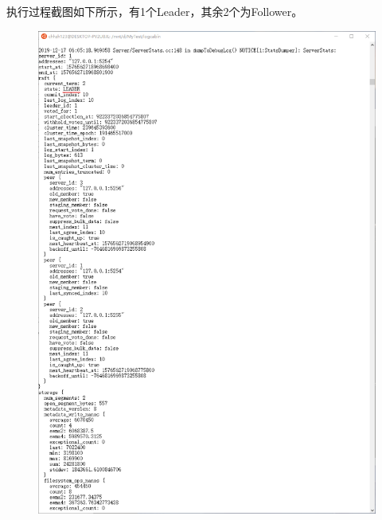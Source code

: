 \documentclass[logo,reportComp]{thesis}
\begin{document}
\begin{answer}
执行过程截图如下所示，有1个Leader，其余2个为Follower。
\begin{figure}[H]
\centering
\includegraphics[width=\linewidth]{fig/leader.png}
\end{figure}
\begin{figure}[H]
\centering

\end{figure}
\end{answer}
\end{document}
